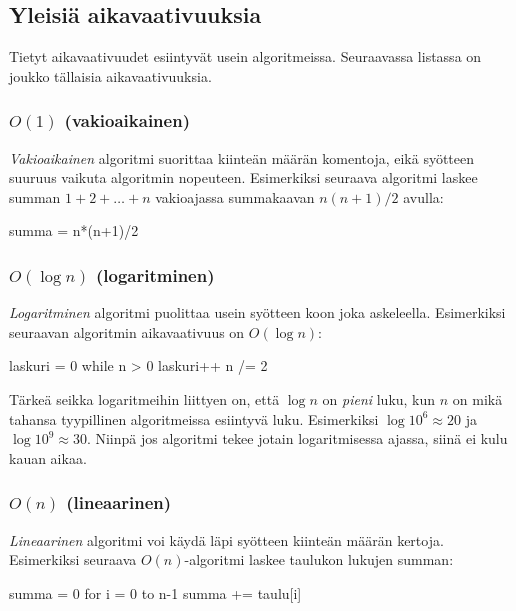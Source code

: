 \subsection{Yleisiä aikavaativuuksia}

Tietyt aikavaativuudet esiintyvät usein algoritmeissa.
Seuraavassa listassa on joukko tällaisia aikavaativuuksia.

\subsubsection{$O(1)$ (vakioaikainen)}

\emph{Vakioaikainen} algoritmi suorittaa kiinteän määrän komentoja,
eikä syötteen suuruus vaikuta algoritmin nopeuteen.
Esimerkiksi seuraava algoritmi laskee summan $1+2+\dots+n$
vakioajassa summakaavan $n(n+1)/2$ avulla:

\begin{code}
summa = n*(n+1)/2
\end{code}

\subsubsection{$O(\log n)$ (logaritminen)}

\emph{Logaritminen} algoritmi puolittaa usein syötteen koon
joka askeleella.
Esimerkiksi seuraavan algoritmin aikavaativuus on $O(\log n)$:

\begin{code}
laskuri = 0
while n > 0
    laskuri++
    n /= 2
\end{code}

Tärkeä seikka logaritmeihin liittyen on, että
$\log n$ on \emph{pieni} luku, kun $n$ on mikä tahansa 
tyypillinen algoritmeissa esiintyvä luku.
Esimerkiksi $\log 10^6 \approx 20$ ja $\log 10^9 \approx 30$.
Niinpä jos algoritmi tekee jotain logaritmisessa ajassa,
siinä ei kulu kauan aikaa.

\subsubsection{$O(n)$ (lineaarinen)}

\emph{Lineaarinen} algoritmi voi käydä läpi syötteen kiinteän määrän kertoja.
Esimerkiksi seuraava $O(n)$-algoritmi laskee taulukon lukujen summan:

\begin{code}
summa = 0
for i = 0 to n-1
    summa += taulu[i]
\end{code}

